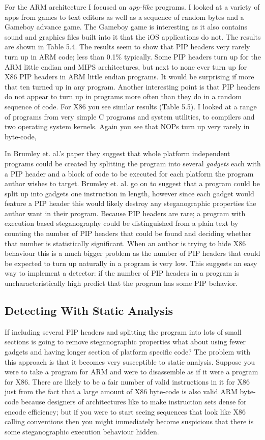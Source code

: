 \documentclass[10pt,]{book}
\begin{document}
For the ARM architecture I focused on \emph{app-like} programs. I looked
at a variety of apps from games to text editors as well as a sequence of
random bytes and a Gameboy advance game. The Gameboy game is interesting
as it also contains sound and graphics files built into it that the iOS
applications do not. The results are shown in Table 5.4. The results
seem to show that PIP headers very rarely turn up in ARM code; less than
0.1\% typically. Some PIP headers turn up for the ARM little endian and
MIPS architectures, but next to none ever turn up for X86 PIP headers in
ARM little endian programs. It would be surprising if more that ten
turned up in any program. Another interesting point is that PIP headers
do not appear to turn up in programs more often than they do in a random
sequence of code. For X86 you see similar results (Table 5.5). I looked
at a range of programs from very simple C programs and system utilities,
to compilers and two operating system kernels. Again you see that NOPs
turn up very rarely in byte-code,

In Brumley et. al.'s paper\autocite{Cha:2010uh} they suggest that whole
platform independent programs could be created by splitting the program
into several \emph{gadgets} each with a PIP header and a block of code
to be executed for each platform the program author wishes to target.
Brumley et. al. go on to suggest that a program could be split up into
gadgets one instruction in length, however since each gadget would
feature a PIP header this would likely destroy any steganographic
properties the author want in their program. Because PIP headers are
rare; a program with execution based steganography could be
distinguished from a plain text by counting the number of PIP headers
that could be found and deciding whether that number is statistically
significant. When an author is trying to hide X86 behaviour this is a
much bigger problem as the number of PIP headers that could be expected
to turn up naturally in a program is very low. This suggests an easy way
to implement a detector: if the number of PIP headers in a program is
uncharacteristically high predict that the program has some PIP
behavior.

\subsection{Detecting With Static Analysis}

If including several PIP headers and splitting the program into lots of
small sections is going to remove steganographic properties what about
using fewer gadgets and having longer section of platform specific code?
The problem with this approach is that it becomes very susceptible to
static analysis. Suppose you were to take a program for ARM and were to
disassemble as if it were a program for X86. There are likely to be a
fair number of valid instructions in it for X86 just from the fact that
a large amount of X86 byte-code is also valid ARM byte-code because
designers of architectures like to make instruction sets dense for
encode efficiency; but if you were to start seeing sequences that look
like X86 calling conventions then you might immediately become
suspicious that there is some steganographic execution behaviour hidden.
\end{document}
